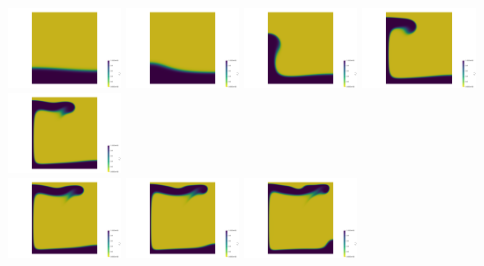 \begin{itemize}
\begin{center}
\includegraphics[width=3cm]{images/benchmark_vaks97/aspect/lvl8/composition0000}
\includegraphics[width=3cm]{images/benchmark_vaks97/aspect/lvl8/composition0001}
\includegraphics[width=3cm]{images/benchmark_vaks97/aspect/lvl8/composition0002}
\includegraphics[width=3cm]{images/benchmark_vaks97/aspect/lvl8/composition0003}
\includegraphics[width=3cm]{images/benchmark_vaks97/aspect/lvl8/composition0004}\\
\includegraphics[width=3cm]{images/benchmark_vaks97/aspect/lvl8/composition0005}
\includegraphics[width=3cm]{images/benchmark_vaks97/aspect/lvl8/composition0006}
\includegraphics[width=3cm]{images/benchmark_vaks97/aspect/lvl8/composition0007}

\end{center}
\end{itemize}

